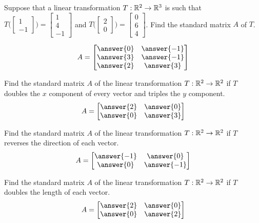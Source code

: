 \documentclass{ximera}
\begin{document}
\begin{problem}\label{prob:standardmatrix}
Suppose that a linear transformation $T:\mathbb{R}^2\rightarrow\mathbb{R}^3$ is such that  $T\Big(\begin{bmatrix}1\\-1\end{bmatrix}\Big)=\begin{bmatrix}1\\4\\-1\end{bmatrix}$ and $T\Big(\begin{bmatrix}2\\0\end{bmatrix}\Big)=\begin{bmatrix}0\\6\\4\end{bmatrix}$.  Find the standard matrix $A$ of $T$.

$$A=\begin{bmatrix}\answer{0}&\answer{-1}\\\answer{3}&\answer{-1}\\\answer{2}&\answer{3}\end{bmatrix}$$
\end{problem}

  \begin{problem}\label{prob:standardmatrix1}
  Find the standard matrix $A$ of the linear transformation $T:\mathbb{R}^2\rightarrow\mathbb{R}^2$ if
  $T$ doubles the $x$ component of every vector and triples the $y$ component.
$$A=\begin{bmatrix}\answer{2}&\answer{0}\\\answer{0}&\answer{3}\end{bmatrix}$$
  \end{problem}
  
  \begin{problem}\label{prob:standardmatrix2} Find the standard matrix $A$ of the linear transformation $T:\mathbb{R}^2\rightarrow\mathbb{R}^2$ if
  $T$ reverses the direction of each vector.
  $$A=\begin{bmatrix}\answer{-1}&\answer{0}\\\answer{0}&\answer{-1}\end{bmatrix}$$
  \end{problem}
  
  \begin{problem}\label{prob:standardmatrix5} Find the standard matrix $A$ of the linear transformation $T:\mathbb{R}^2\rightarrow\mathbb{R}^2$ if
  $T$ doubles the length of each vector.
    $$A=\begin{bmatrix}\answer{2}&\answer{0}\\\answer{0}&\answer{2}\end{bmatrix}$$
  \end{problem}
  
\end{document}
